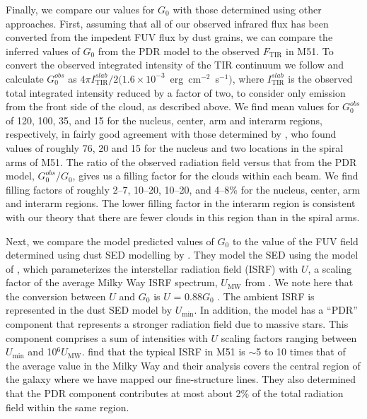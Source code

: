 \documentclass[preprint2]{aastex}
\begin{document}
Finally, we compare our values for $G_{0}$ with those determined using other approaches.  First, assuming that all of our observed infrared flux has been converted from the impedent FUV flux by dust grains, we can compare the inferred values of $G_{0}$ from the PDR model to the observed $F_{\mathrm{TIR}}$ in M51.  To convert the observed integrated intensity of the TIR continuum we follow \citet{2005A&A...441..961K} and calculate $G_{0}^{obs}$ as $4\pi I_{\mathrm{TIR}}^{slab}/2(1.6 \times 10^{-3}$~erg~cm$^{-2}$~s$^{-1})$, where $I_{\mathrm{TIR}}^{slab}$ is the observed total integrated intensity reduced by a factor of two, to consider only emission from the front side of the cloud, as described above.  We find mean values for $G_{0}^{obs}$ of 120, 100, 35, and 15 for the nucleus, center, arm and interarm regions, respectively, in fairly good agreement with those determined by \citet{2005A&A...441..961K}, who found values of roughly 76, 20 and 15 for the nucleus and two locations in the spiral arms of M51.  The ratio of the observed radiation field versus that from the PDR model, $G_{0}^{obs}$/$G_{0}$, gives us a filling factor for the clouds within each beam.  We find filling factors of roughly 2--7, 10--20, 10--20, and 4--8\% for the nucleus, center, arm and interarm regions.  The lower filling factor in the interarm region is consistent with our theory that there are fewer clouds in this region than in the spiral arms.

Next, we compare the model predicted values of $G_{0}$ to the value of the FUV field determined using dust SED modelling by \citet{2012ApJ...755..165M}.  They model the SED using the model of \citet{2007ApJ...657..810D}, which parameterizes the interstellar radiation field (ISRF) with $U$, a scaling factor of the average Milky Way ISRF spectrum, $U_{\mathrm{MW}}$ from \citet{1983A&A...128..212M}. We note here that the conversion between $U$ and $G_{0}$ is $U$ = 0.88$G_{0}$ \citep{2007ApJ...663..866D}.  The ambient ISRF is represented in the dust SED model by $U_{\mathrm{min}}$. In addition, the model has a ``PDR'' component that represents a stronger radiation field due to massive stars.  This component comprises a sum of intensities with $U$ scaling factors ranging between $U_{\mathrm{min}}$ and 10$^{6}U_{\mathrm{MW}}$.  \citet{2012ApJ...755..165M} find that the typical ISRF in M51 is $\sim$5 to 10 times that of the average value in the Milky Way and their analysis covers the central region of the galaxy where we have mapped our fine-structure lines.  They also determined that the PDR component contributes at most about 2\% of the total radiation field within the same region.
\end{document}

